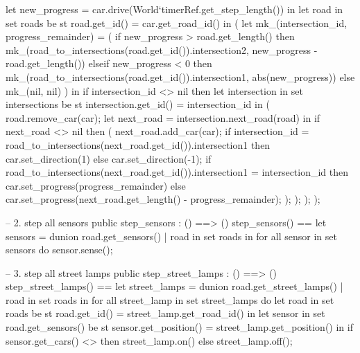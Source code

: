 \documentclass[a4paper]{article}
\begin{document}
\begin{vdm_al}
                let new_progress = car.drive(World`timerRef.get_step_length()) in 
                    let road in set roads be st road.get_id() = car.get_road_id() in (
                        let mk_(intersection_id, progress_remainder) = (
                            if new_progress > road.get_length() then
                                mk_(road_to_intersections(road.get_id()).intersection2, new_progress - road.get_length())
                            elseif new_progress < 0 then
                                mk_(road_to_intersections(road.get_id()).intersection1, abs(new_progress))
                            else mk_(nil, nil)
                            ) in
                                if intersection_id <> nil then
                                    let intersection in set intersections be st intersection.get_id() = intersection_id in (
                                        road.remove_car(car);
                                        let next_road = intersection.next_road(road) in
                                            if next_road <> nil then (
                                                next_road.add_car(car);
                                                if intersection_id = road_to_intersections(next_road.get_id()).intersection1 then
                                                    car.set_direction(1)
                                                else
                                                    car.set_direction(-1);
                                                if road_to_intersections(next_road.get_id()).intersection1 = intersection_id then
                                                    car.set_progress(progress_remainder)
                                                else
                                                    car.set_progress(next_road.get_length() - progress_remainder);
                                            );
                                    );
                    );
            );

    -- 2. step all sensors
    public step_sensors : () ==> ()
    step_sensors() ==
        let sensors = dunion {
            road.get_sensors()
            | road in set roads
        } in
            for all sensor in set sensors do
                sensor.sense();

    -- 3. step all street lamps
    public step_street_lamps : () ==> ()
    step_street_lamps() ==
        let street_lamps = dunion {
            road.get_street_lamps()
            | road in set roads
        } in
            for all street_lamp in set street_lamps do
                let road in set roads be st road.get_id() = street_lamp.get_road_id() in
                    let sensor in set road.get_sensors() be st sensor.get_position() = street_lamp.get_position() in
                        if sensor.get_cars() <> {} then
                            street_lamp.on()
                        else
                            street_lamp.off();


\end{vdm_al}
\end{document}
